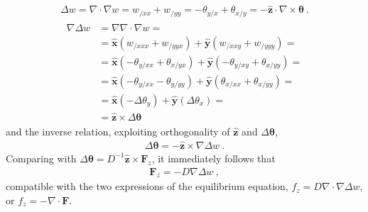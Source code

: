 \documentclass[letterpaper,10pt,english]{jupyterBook}
\begin{document}
\sphinxAtStartPar
{}
\begin{equation*}
\begin{split}\Delta w = \nabla \cdot \nabla w = w_{/xx} + w_{/yy} = - \theta_{y/x} + \theta_{x/y} = - \hat{\mathbf{z}} \cdot \nabla \times \boldsymbol \theta \ .\end{split}
\end{equation*}
\sphinxAtStartPar
{}
\begin{equation*}
\begin{split}\begin{aligned}
  \nabla \Delta w
  & = \nabla \nabla \cdot \nabla w  = \\
  & = \hat{\mathbf{x}} \left( w_{/xxx} + w_{/yyx} \right) + \hat{\mathbf{y}} \left( w_{/xxy} + w_{/yyy} \right) = \\
  & = \hat{\mathbf{x}} \left( - \theta_{y/xx} + \theta_{x/yx} \right) + \hat{\mathbf{y}} \left( - \theta_{y/xy} + \theta_{x/yy}  \right) = \\
  & = \hat{\mathbf{x}} \left( - \theta_{y/xx} - \theta_{y/yy} \right) + \hat{\mathbf{y}} \left(   \theta_{x/xx} + \theta_{x/yy}  \right) = \\
  & = \hat{\mathbf{x}} \left( - \Delta \theta_y \right) + \hat{\mathbf{y}} \left( \Delta \theta_x \right) = \\
  & = \hat{\mathbf{z}} \times \Delta \boldsymbol\theta
\end{aligned}\end{split}
\end{equation*}
\sphinxAtStartPar
and the inverse relation, exploiting orthogonality of \(\hat{\mathbf{z}}\) and \(\Delta \boldsymbol\theta\),
\begin{equation*}
\begin{split}\Delta \boldsymbol\theta = - \hat{\mathbf{z}} \times \nabla \Delta w \ .\end{split}
\end{equation*}
\sphinxAtStartPar
Comparing with \(\Delta \boldsymbol\theta = D^{-1} \hat{\mathbf{z}} \times \mathbf{F}_z\), it immediately follows that
\begin{equation*}
\begin{split}\mathbf{F}_z = - D \nabla \Delta w \ ,\end{split}
\end{equation*}
\sphinxAtStartPar
compatible with the two expressions of the equilibrium equation, \(f_z = D \nabla \cdot \nabla \Delta w\), or \(f_z = - \nabla \cdot \mathbf{F}\).
\end{document}
